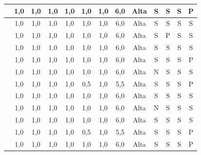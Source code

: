 \begin{scriptsize}
\begin{longtable}{|p{3cm}|c|c|c|c|c|c|c|c|c|c|c|c|}
\cite{christel2005addressing}     & 1,0 & 1,0 & 1,0 & 1,0 & 1,0 & 1,0 & 6,0 & Alta & S & S & S & P \\ \hline
\cite{zaphiris2003age}            & 1,0 & 1,0 & 1,0 & 1,0 & 1,0 & 1,0 & 6,0 & Alta & S & S & S & S \\ \hline
\cite{crabb2014age}               & 1,0 & 1,0 & 1,0 & 1,0 & 1,0 & 1,0 & 6,0 & Alta & S & P & S & S \\ \hline
\cite{romano2013age}              & 1,0 & 1,0 & 1,0 & 1,0 & 1,0 & 1,0 & 6,0 & Alta & S & S & S & S \\ \hline
\cite{mowar2025codea11y}          & 1,0 & 1,0 & 1,0 & 1,0 & 1,0 & 1,0 & 6,0 & Alta & S & S & S & P \\ \hline
\cite{kurniawan2005research}      & 1,0 & 1,0 & 1,0 & 1,0 & 1,0 & 1,0 & 6,0 & Alta & N & S & S & S \\ \hline
\cite{kanjanakuha2019comprehensibility} & 1,0 & 1,0 & 1,0 & 1,0 & 0,5 & 1,0 & 5,5 & Alta & S & S & S & P \\ \hline
\cite{artis2006effects}           & 1,0 & 1,0 & 1,0 & 1,0 & 1,0 & 1,0 & 6,0 & Alta & S & S & S & S \\ \hline
\cite{lindberg2021towards}        & 1,0 & 1,0 & 1,0 & 1,0 & 1,0 & 1,0 & 6,0 & Alta & N & S & S & S \\ \hline
\cite{arfaa2015usability}         & 1,0 & 1,0 & 1,0 & 1,0 & 1,0 & 1,0 & 6,0 & Alta & S & S & S & S \\ \hline
\cite{molina2011using}            & 1,0 & 1,0 & 1,0 & 1,0 & 0,5 & 1,0 & 5,5 & Alta & S & S & S & P \\ \hline
\cite{vaughan2006why}             & 1,0 & 1,0 & 1,0 & 1,0 & 1,0 & 1,0 & 6,0 & Alta & S & S & S & P \\ \hline
\end{longtable}
\end{scriptsize}